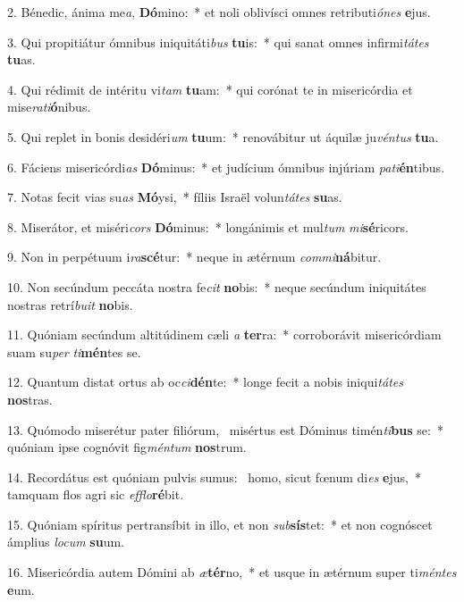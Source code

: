2. Bénedic, ánima me\textit{a}, \textbf{Dó}mino:~*  et noli oblivísci omnes retributi\textit{ó}\textit{nes} \textbf{e}jus.\

3. Qui propitiátur ómnibus iniquitáti\textit{bus} \textbf{tu}is:~*  qui sanat omnes infirmi\textit{tá}\textit{tes} \textbf{tu}as.\

4. Qui rédimit de intéritu vi\textit{tam} \textbf{tu}am:~*  qui corónat te in misericórdia et mise\textit{ra}\textit{ti}\textbf{ó}nibus.\

5. Qui replet in bonis desidéri\textit{um} \textbf{tu}um:~*  renovábitur ut áquilæ ju\textit{vén}\textit{tus} \textbf{tu}a.\

6. Fáciens misericórdi\textit{as} \textbf{Dó}minus:~*  et judícium ómnibus injúriam \textit{pa}\textit{ti}\textbf{én}tibus.\

7. Notas fecit vias su\textit{as} \textbf{Mó}ysi,~*  fíliis Israël volun\textit{tá}\textit{tes} \textbf{su}as.\

8. Miserátor, et miséri\textit{cors} \textbf{Dó}minus:~*  longánimis et mul\textit{tum} \textit{mi}\textbf{sé}ricors.\

9. Non in perpétuum i\textit{ra}\textbf{scé}tur:~*  neque in ætérnum \textit{com}\textit{mi}\textbf{ná}bitur.\

10. Non secúndum peccáta nostra fe\textit{cit} \textbf{no}bis:~*  neque secúndum iniquitátes nostras retrí\textit{bu}\textit{it} \textbf{no}bis.\

11. Quóniam secúndum altitúdinem cæli \textit{a} \textbf{ter}ra:~*  corroborávit misericórdiam suam su\textit{per} \textit{ti}\textbf{mén}tes se.\

12. Quantum distat ortus ab oc\textit{ci}\textbf{dén}te:~*  longe fecit a nobis iniqui\textit{tá}\textit{tes} \textbf{nos}tras.\

13. Quómodo miserétur pater filiórum, \dag\  misértus est Dóminus timén\textit{ti}\textbf{bus} se:~*  quóniam ipse cognóvit fig\textit{mén}\textit{tum} \textbf{nos}trum.\

14. Recordátus est quóniam pulvis sumus: \dag\  homo, sicut fœnum di\textit{es} \textbf{e}jus,~*  tamquam flos agri sic \textit{ef}\textit{flo}\textbf{ré}bit.\

15. Quóniam spíritus pertransíbit in illo, et non \textit{sub}\textbf{sís}tet:~*  et non cognóscet ámplius \textit{lo}\textit{cum} \textbf{su}um.\

16. Misericórdia autem Dómini ab \textit{æ}\textbf{tér}no,~*  et usque in ætérnum super ti\textit{mén}\textit{tes} \textbf{e}um.\

